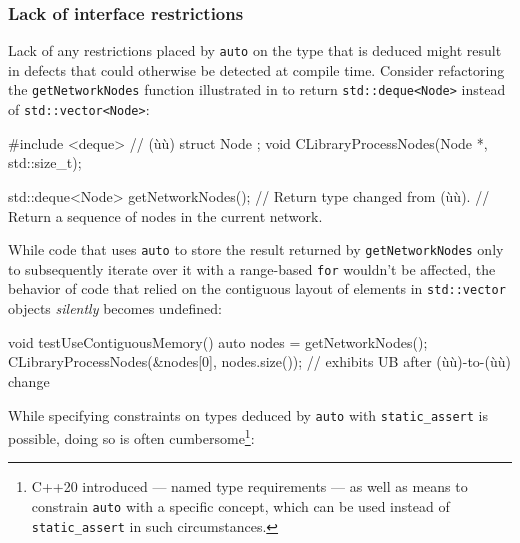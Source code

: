 \subsubsection[Lack of interface restrictions]{Lack of interface restrictions}\label{lack-of-interface-restrictions}

Lack of any restrictions placed by \lstinline!auto! on the type that is
deduced might result in defects that could otherwise be detected at
compile time. Consider refactoring the \lstinline!getNetworkNodes! function
illustrated in  to return \lstinline!std::deque<Node>! instead of
\lstinline!std::vector<Node>!:

\begin{emcppshiddenlisting}[emcppsbatch=e18]
#include <deque>     // (ù{}ù)
struct Node {};
void CLibraryProcessNodes(Node *, std::size_t);
\end{emcppshiddenlisting}
\begin{emcppslisting}[emcppsbatch=e18]
std::deque<Node> getNetworkNodes();  // Return type changed from (ù{}ù).
    // Return a sequence of nodes in the current network.
\end{emcppslisting}

\noindent While code that uses \lstinline!auto! to store the result returned by
\lstinline!getNetworkNodes! only to subsequently iterate over it with a
range-based \lstinline!for! wouldn't be affected, the behavior of code that
relied on the contiguous layout of elements in \lstinline!std::vector!
objects \emph{silently} becomes undefined:

\begin{emcppslisting}[emcppsbatch=e18]
void testUseContiguousMemory()
{
    auto nodes = getNetworkNodes();
    CLibraryProcessNodes(&nodes[0], nodes.size());
        // exhibits UB after (ù{}ù)-to-(ù{}ù) change
}
\end{emcppslisting}

\noindent While specifying constraints on types deduced by
\lstinline!auto! with \lstinline!static_assert! is possible, doing so is often
cumbersome{\cprotect\footnote{C++20 introduced  ---
named type requirements --- as well as means to constrain
\lstinline!auto! with a specific concept, which can be used instead of
  \lstinline!static_assert! in such circumstances.}}:

